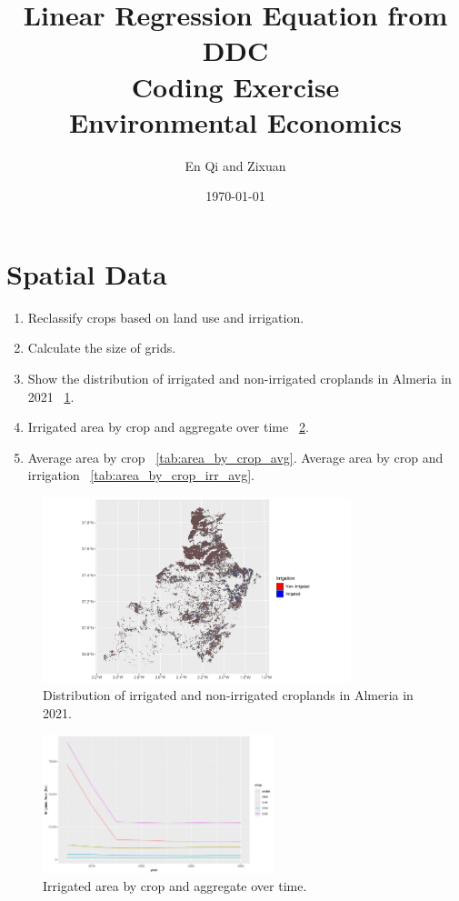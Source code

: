 \documentclass[12pt]{article}[margin=1in]
\title{\textbf{Linear Regression Equation from DDC} \\
\vspace{.3cm}
\large Coding Exercise \\
Environmental Economics}
\author{En Qi and Zixuan}
\date{\today}
\begin{document}
\maketitle

\section{Spatial Data}

\begin{enumerate}
    \item Reclassify crops based on land use and irrigation.
    \item Calculate the size of grids.
    \item Show the distribution of irrigated and non-irrigated croplands in Almeria in 2021 ~\ref{fig:land_use_distribution_almeria_2021}.
    \item Irrigated area by crop and aggregate over time ~\ref{fig:irrigated_area_by_crop_over_time}.
    \item Average area by crop ~\ref{tab:area_by_crop_avg}. Average area by crop and irrigation ~\ref{tab:area_by_crop_irr_avg}.
\end{enumerate}


\begin{figure}[!htbp]
    \centering
    \includegraphics[width=0.8\textwidth]{../Figures/land_use_distribution_almeria_2021.pdf}
    \caption{Distribution of irrigated and non-irrigated croplands in Almeria in 2021.}
    \label{fig:land_use_distribution_almeria_2021}
\end{figure}

\begin{figure}[!htbp]
    \centering
    \includegraphics[width=0.6\textwidth]{../Figures/irrigated_area_by_crop_over_time.pdf}
    \caption{Irrigated area by crop and aggregate over time.}
    \label{fig:irrigated_area_by_crop_over_time}
\end{figure}
\end{document}
